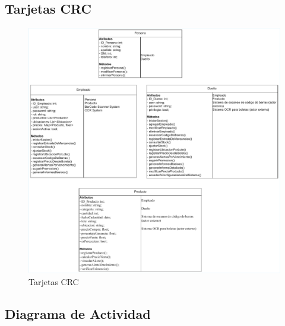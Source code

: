 \documentclass[twoside]{article}
\begin{document}
\newpage
\subsection{Tarjetas CRC}
\begin{figure}[!h]
    \centering
    \includegraphics[scale=0.7]{CRCcards.pdf}
    \caption{Tarjetas CRC}
    \label{fig:enter-label}
\end{figure}
\newpage
\subsection{Diagrama de Actividad}
\end{document}
